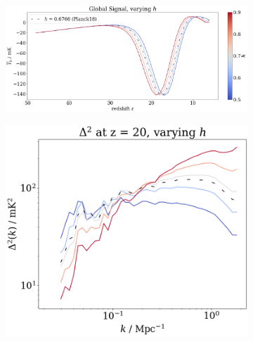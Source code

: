 \documentclass[floats,floatfix,showpacs,amssymb,prd,superscriptaddress,nofootinbib]{revtex4-2} %
\begin{document}
\begin{figure}[H]
     \centering
     \begin{subfigure}[b]{0.9\textwidth}
         \centering
         \includegraphics[width=\textwidth]{images/simulation_results/global_signal_h.png}
         \label{fig:global_signal_h}
     \end{subfigure}
     \hfill
     \begin{subfigure}[b]{0.45\textwidth}
         \centering
         \includegraphics[width=\textwidth]{images/simulation_results/power_spectrum_fixed_z_20_h.png}
         \label{fig:power_spectrum_fixed_z_20_h}
     \end{subfigure}
     \hfill
     \begin{subfigure}[b]{0.45\textwidth}
         \centering

\end{subfigure}
\end{figure}
\end{document}
